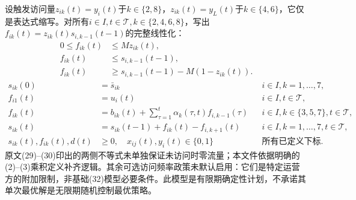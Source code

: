 \documentclass[UTF8,11pt]{ctexart}
\begin{document}
设触发访问量$z_{ik}(t)=y_i(t)$于$k\in\{2,8\}$，$z_{ik}(t)=y_L(t)$于$k\in\{4,6\}$，它仅是表达式缩写。对所有$i\in I,t\in\mathcal T,k\in\{2,4,6,8\}$，写出$f_{ik}(t)=z_{ik}(t)s_{i,k-1}(t-1)$的完整线性化：
\begin{align}
0\leq f_{ik}(t)&\leq M z_{ik}(t),\\
f_{ik}(t)&\leq s_{i,k-1}(t-1),\\
f_{ik}(t)&\geq s_{i,k-1}(t-1)-M(1-z_{ik}(t)).
\end{align}
\begin{align}
s_{ik}(0)&=\bar s_{ik} && i\in I,k=1,\ldots,7,\\
f_{i1}(t)&=u_i(t) &&i\in I,t\in\mathcal T,\\
f_{ik}(t)&=b_{ik}(t)+\sum_{\tau=1}^{t}\alpha_k(\tau,t)f_{i,k-1}(\tau)&&i\in I,k\in\{3,5,7\},t\in\mathcal T,\\
s_{ik}(t)&=s_{ik}(t-1)+f_{ik}(t)-f_{i,k+1}(t)&&i\in I,k=1,\ldots,7,t\in\mathcal T,\\
s_{ik}(t),f_{ik}(t),d(t)&\geq0,\quad x_{ij}(t),y_i(t)\in\{0,1\}&&\text{所有已定义下标}.
\end{align}
原文(29)--(30)印出的两侧不等式未单独保证未访问时零流量；本文件依据明确的(2)--(3)乘积定义补齐逻辑。其余可选访问频率政策未默认启用：它们是特定运营方的附加限制，非基础(32)模型必要条件。此模型是有限期确定性计划，不承诺其单次最优解是无限期随机控制最优策略。
\end{document}
